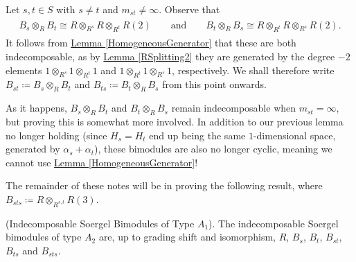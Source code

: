 \noindent Let $s, t \in S$ with $s \neq t$ and $m_{st} \neq \infty$. Observe that
\begin{align*}
\begin{split}
B_s \otimes_R B_t \cong R \otimes_{R^s} R \otimes_{R^t} R(2)\qquad\text{and}\qquad B_t \otimes_R B_s \cong R \otimes_{R^t} R \otimes_{R^s} R(2).
\end{split}
\end{align*}
\noindent It follows from \hyperref[HomogeneousGenerator]{Lemma \ref*{HomogeneousGenerator}} that these are both indecomposable, as by \hyperref[RSplitting2]{Lemma \ref*{RSplitting2}} they are generated by the degree $-2$ elements $1 \otimes_{R^s} 1 \otimes_{R^t} 1$ and $1 \otimes_{R^t} 1 \otimes_{R^s} 1$, respectively. We shall therefore write $B_{st} \coloneqq B_s \otimes_R B_t$ and $B_{ts} \coloneqq B_t \otimes_R B_s$ from this point onwards.\\

\noindent\begin{remark} As it happens, $B_s \otimes_R B_t$ and $B_t \otimes_R B_s$ remain indecomposable when $m_{st} = \infty$, but proving this is somewhat more involved. In addition to our previous lemma no longer holding (since $H_s = H_t$ end up being the same $1$-dimensional space, generated by $\alpha_s + \alpha_t$), these bimodules are also no longer cyclic, meaning we cannot use \hyperref[HomogeneousGenerator]{Lemma \ref*{HomogeneousGenerator}}!\\
\end{remark}

\noindent The remainder of these notes will be in proving the following result, where $B_{sts} \coloneqq R \otimes_{R^{s,t}} R(3)$.\\%

\noindent\begin{proposition}\textup{(Indecomposable Soergel Bimodules of Type $A_1$).} The indecomposable Soergel bimodules of type $A_2$ are, up to grading shift and isomorphism, $R$, $B_s$, $B_t$, $B_{st}$, $B_{ts}$ and $B_{sts}$.
\end{proposition}\newpage

